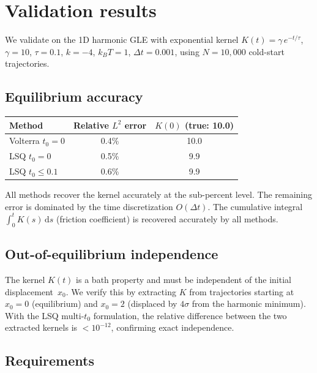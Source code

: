 \documentclass[11pt]{article}
\newcommand{\dd}{\mathrm{d}}
\newcommand{\dt}{\Delta t}
\begin{document}
\section{Validation results}

We validate on the 1D harmonic GLE with exponential kernel
$K(t) = \gamma\,e^{-t/\tau}$, $\gamma = 10$, $\tau = 0.1$,
$k = -4$, $k_BT = 1$, $\dt = 0.001$, using $N = 10{,}000$
cold-start trajectories.

\subsection{Equilibrium accuracy}

\begin{center}
\begin{tabular}{l c c}
\hline
Method & Relative $L^2$ error & $K(0)$ (true: 10.0) \\
\hline
Volterra $t_0=0$           & 0.4\% & 10.0 \\
LSQ $t_0=0$                & 0.5\% & 9.9 \\
LSQ $t_0 \leq 0.1$         & 0.6\% & 9.9 \\
\hline
\end{tabular}
\end{center}

All methods recover the kernel accurately at the sub-percent level.
The remaining error is dominated by the time discretization $O(\dt)$.
The cumulative integral $\int_0^t K(s)\,\dd s$ (friction coefficient) is
recovered accurately by all methods.

\subsection{Out-of-equilibrium independence}

The kernel $K(t)$ is a bath property and must be independent of the initial
displacement~$x_0$.  We verify this by extracting $K$ from trajectories
starting at $x_0 = 0$ (equilibrium) and $x_0 = 2$ (displaced by $4\sigma$
from the harmonic minimum).
With the LSQ multi-$t_0$ formulation, the relative difference between the
two extracted kernels is $< 10^{-12}$, confirming exact independence.

\subsection{Requirements}
\end{document}
